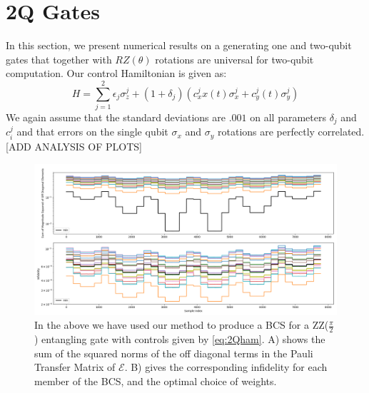 \documentclass[aps,nofootinbib,pra,notitlepage,twocolumn]{revtex4-1}
\begin{document}
\section{2Q Gates}\label{2Q Gates}
 In this section, we present numerical results on a generating one and two-qubit gates that together with $RZ(\theta)$ rotations are universal for two-qubit computation. Our control Hamiltonian is given as: 
\begin{equation} \label{eq:2Qham}
H = \sum_{j=1}^2\epsilon_j\sigma_z^j + (1 + \delta_j)(c_x^jx(t)\sigma_x^j + c_y^j(t)\sigma_y^j)
\end{equation}
We again assume that the standard deviations are $.001$ on all parameters $\delta_j$ and $c^j_i$ and that errors on the single qubit $\sigma_x$ and $\sigma_y$ rotations are perfectly correlated.
[ADD ANALYSIS OF PLOTS]
\begin{figure}[t]
\centering
\includegraphics[width=\textwidth]{2Q.png}
\caption{In the above we have used our method to produce a BCS for a ZZ($\frac{\pi}{2}$) entangling gate with controls given by \ref{eq:2Qham}. A) shows the sum of the squared norms of the off diagonal terms in the Pauli Transfer Matrix of $\mathcal{E}$. B) gives the corresponding infidelity for each member of the BCS, and the optimal choice of weights.}
\end{figure}












\end{document}
